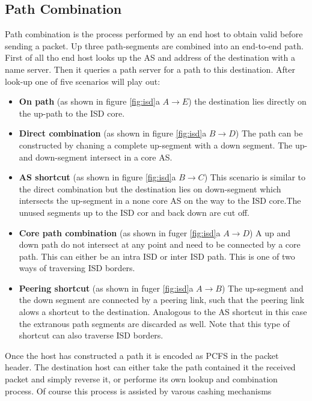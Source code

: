 \documentclass[../eva1_scion.tex]{subfiles}
\begin{document}
    \subsection{Path Combination} \label{ssec:path_assembly}
    Path combination is the process performed by an end host to obtain valid before sending a packet. Up three path-segments are combined into an end-to-end path. First of all tho end host looks up the AS and address of the destination with a name server. Then it queries a path server for a path to this destination. After look-up one of five scenarios will play out:
    \begin{itemize}
        \item \textbf{On path} (as shown in figure \ref{fig:isd}a $A \rightarrow E$) the destination lies directly on the up-path to the ISD core.
        \item \textbf{Direct combination} (as shown in figure \ref{fig:isd}a $B \rightarrow D$) The path can be constructed by chaning a complete up-segment with a down segment. The up- and down-segment intersect in a core AS.
        \item \textbf{AS shortcut} (as shown in figure \ref{fig:isd}a $B \rightarrow C$) This scenario is similar to the direct combination but the destination lies on down-segment which intersects the up-segment in a none core AS on the way to the ISD core.The unused segments up to the ISD cor and back down are cut off.
        \item \textbf{Core path combination} (as shown in fuger \ref{fig:isd}a $A \rightarrow D$) A up and down path do not intersect at any point and need to be connected by a core path. This can either be an intra ISD or inter ISD path. This is one of two ways of traversing ISD borders.
        \item \textbf{Peering shortcut} (as shown in fuger \ref{fig:isd}a $A \rightarrow B$) The up-segment and the down segment are connected by a peering link, such that the peering link alows a shortcut to the destination. Analogous to the AS shortcut in this case the extranous path segments are discarded as well. Note that this type of shortcut can also traverse ISD borders.
    \end{itemize}

    Once the host has constructed a path it is encoded as PCFS in the packet header. The destination host can either take the path contained it the received packet and simply reverse it, or performe its own lookup and combination process. Of course this process is assisted by varous cashing mechanisms 
\end{document}

